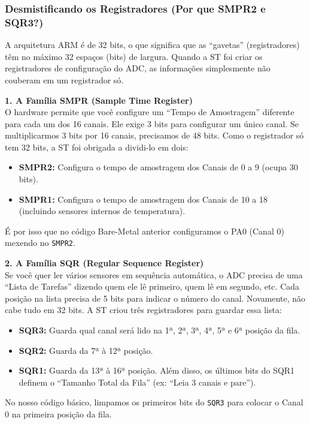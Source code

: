 \documentclass[12pt,a4paper]{article}
\begin{document}
\subsubsection{Desmistificando os Registradores (Por que SMPR2 e SQR3?)}
A arquitetura ARM é de 32 bits, o que significa que as ``gavetas'' (registradores) têm no máximo 32 espaços (bits) de largura. Quando a ST foi criar os registradores de configuração do ADC, as informações simplesmente não couberam em um registrador só.

\vspace{0.3cm}
\noindent\textbf{1. A Família SMPR (Sample Time Register)}\\
O hardware permite que você configure um ``Tempo de Amostragem'' diferente para cada um dos 16 canais. Ele exige 3 bits para configurar um único canal.
Se multiplicarmos 3 bits por 16 canais, precisamos de 48 bits. Como o registrador só tem 32 bits, a ST foi obrigada a dividi-lo em dois:
\begin{itemize}
    \item \textbf{SMPR2:} Configura o tempo de amostragem dos Canais de 0 a 9 (ocupa 30 bits).
    \item \textbf{SMPR1:} Configura o tempo de amostragem dos Canais de 10 a 18 (incluindo sensores internos de temperatura).
\end{itemize}
É por isso que no código Bare-Metal anterior configuramos o PA0 (Canal 0) mexendo no \texttt{SMPR2}.

\vspace{0.3cm}
\noindent\textbf{2. A Família SQR (Regular Sequence Register)}\\
Se você quer ler vários sensores em sequência automática, o ADC precisa de uma ``Lista de Tarefas'' dizendo quem ele lê primeiro, quem lê em segundo, etc.
Cada posição na lista precisa de 5 bits para indicar o número do canal. Novamente, não cabe tudo em 32 bits. A ST criou três registradores para guardar essa lista:
\begin{itemize}
    \item \textbf{SQR3:} Guarda qual canal será lido na 1ª, 2ª, 3ª, 4ª, 5ª e 6ª posição da fila.
    \item \textbf{SQR2:} Guarda da 7ª à 12ª posição.
    \item \textbf{SQR1:} Guarda da 13ª à 16ª posição. Além disso, os últimos bits do SQR1 definem o ``Tamanho Total da Fila'' (ex: ``Leia 3 canais e pare'').
\end{itemize}
No nosso código básico, limpamos os primeiros bits do \texttt{SQR3} para colocar o Canal 0 na primeira posição da fila.
\end{document}
